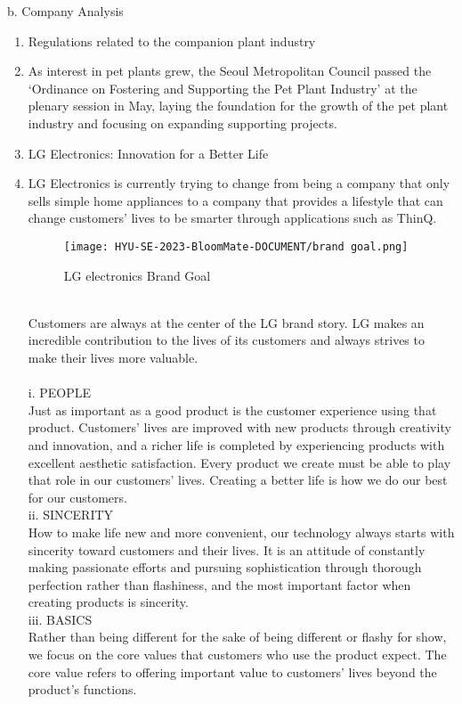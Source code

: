 \documentclass[conference, a4paper]{IEEEtran}
\begin{document}
\indent b. Company Analysis
\begin{enumerate}
    \item Regulations related to the companion plant industry
    \item[] As interest in pet plants grew, the Seoul Metropolitan Council passed the ‘Ordinance on Fostering and Supporting the Pet Plant Industry’ at the plenary session in May, laying the foundation for the growth of the pet plant industry and focusing on expanding supporting projects.\cite{mediapen_article} \\
    
    \item LG Electronics: Innovation for a Better Life 
    \item[] LG Electronics is currently trying to change from being a company that only sells simple home appliances to a company that provides a lifestyle that can change customers' lives to be smarter through applications such as ThinQ.
    \begin{figure}[h]
\texttt{[image: HYU-SE-2023-BloomMate-DOCUMENT/brand goal.png]}
\label{fig:brand}
\caption{LG electronics Brand Goal} 
\end{figure}
\\
Customers are always at the center of the LG brand story. LG makes an incredible contribution to the lives of its customers and always strives to make their lives more valuable.\\
\\
\indent i. PEOPLE\\
Just as important as a good product is the customer experience using that product. Customers' lives are improved with new products through creativity and innovation, and a richer life is completed by experiencing products with excellent aesthetic satisfaction. Every product we create must be able to play that role in our customers’ lives. Creating a better life is how we do our best for our customers.\\

ii. SINCERITY \\
How to make life new and more convenient, our technology always starts with sincerity toward customers and their lives. It is an attitude of constantly making passionate efforts and pursuing sophistication through thorough perfection rather than flashiness, and the most important factor when creating products is sincerity.\\

iii. BASICS \\
Rather than being different for the sake of being different or flashy for show, we focus on the core values that customers who use the product expect. The core value refers to offering important value to customers' lives beyond the product's functions. \cite{lge_document}
\\
\end{enumerate}
\end{document}
